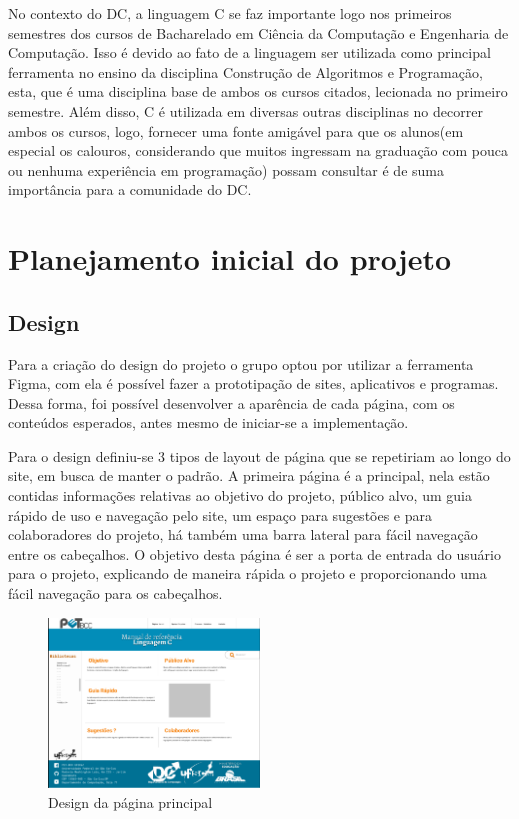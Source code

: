 \documentclass{article}
\begin{document}
No contexto do \ac{DC}, a linguagem C se faz importante logo nos primeiros semestres dos cursos de Bacharelado em Ciência da Computação e Engenharia de Computação. Isso é devido ao fato de a linguagem ser utilizada como principal ferramenta no ensino da disciplina Construção de Algoritmos e Programação, esta, que é uma disciplina base de ambos os cursos citados, lecionada no primeiro semestre. Além disso, C é utilizada em diversas outras disciplinas no decorrer ambos os cursos, logo, fornecer uma fonte amigável para que os alunos(em especial os calouros, considerando que muitos ingressam na graduação com pouca ou nenhuma experiência em programação) possam consultar é de suma importância para a comunidade do \ac{DC}.

\section{Planejamento inicial do projeto}
\subsection{Design}
Para a criação do design do projeto o grupo optou por utilizar a ferramenta Figma, com ela é possível fazer a prototipação de sites, aplicativos e programas. Dessa forma, foi possível desenvolver a aparência de cada página, com os conteúdos esperados, antes mesmo de iniciar-se a implementação.

Para o design definiu-se 3 tipos de layout de página que se repetiriam ao longo do site, em busca de manter o padrão. A primeira página é a principal, nela estão contidas informações relativas ao objetivo do projeto, público alvo, um guia rápido de uso e navegação pelo site, um espaço para sugestões e para colaboradores do projeto, há também uma barra lateral para fácil navegação entre os cabeçalhos. O objetivo desta página é ser a porta de entrada do usuário para o projeto, explicando de maneira rápida o projeto e proporcionando uma fácil navegação para os cabeçalhos.

\begin{figure}
  \caption{Design da página principal}
  \centering
  \includegraphics[width=0.5\textwidth]{print_pagina_principal.png}
\end{figure}
\end{document}
